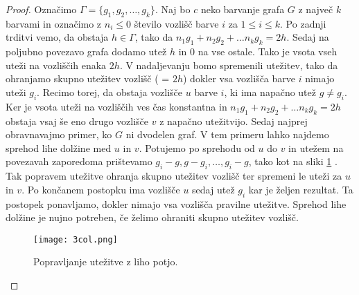 \documentclass[12pt,a4paper,twoside]{article}
\theoremstyle{definition} %
\theoremstyle{plain} %
\numberwithin{equation}{section}  %
\begin{document}
\begin{proof}
	Označimo $\Gamma = \{g_1, g_2, \ldots, g_k\}$. Naj bo $c$ neko barvanje grafa $G$ z največ $k$ barvami in označimo z $n_i \le 0$ število vozlišč barve $i$ za $1 \le i \le k$. Po zadnji trditvi vemo, da obstaja $h \in \Gamma$, tako da $n_1g_1 + n_2g_2 + \ldots n_kg_k = 2h$. Sedaj na poljubno povezavo grafa dodamo utež $h$ in $0$ na vse ostale. Tako je vsota vseh uteži na vozliščih enaka $2h$. V nadaljevanju bomo spremenili utežitev, tako da ohranjamo skupno utežitev vozlišč ( = $2h$) dokler vsa vozlišča barve $i$ nimajo uteži $g_i$. Recimo torej, da obstaja vozlišče $u$ barve $i$, ki ima napačno utež $g \neq g_i$. Ker je vsota uteži na vozliščih ves čas konstantna in $n_1g_1 + n_2g_2 + \ldots n_kg_k = 2h$ obstaja vsaj še eno drugo vozlišče $v$ z napačno utežitvijo. Sedaj najprej obravnavajmo primer, ko $G$ ni dvodelen graf. V tem primeru lahko najdemo sprehod lihe dolžine med $u$ in $v$. Potujemo po sprehodu od $u$ do $v$ in utežem na povezavah zaporedoma prištevamo $g_i - g, g - g_i, \ldots, g_i - g$, tako kot na sliki \ref{im1} . Tak popravem utežitve ohranja skupno utežitev vozlišč ter spremeni le uteži za $u$ in $v$. Po končanem postopku ima vozlišče $u$ sedaj utež $g_i$ kar je željen rezultat. Ta postopek ponavljamo, dokler nimajo vsa vozlišča pravilne utežitve. Sprehod lihe dolžine je nujno potreben, če želimo ohraniti skupno utežitev vozlišč.
 \begin{figure}[h!]
\caption{Popravljanje utežitve z liho potjo.}
\label{im1}
\centering
    \texttt{[image: 3col.png]}
    \end{figure}
	

\end{proof}
\end{document}
